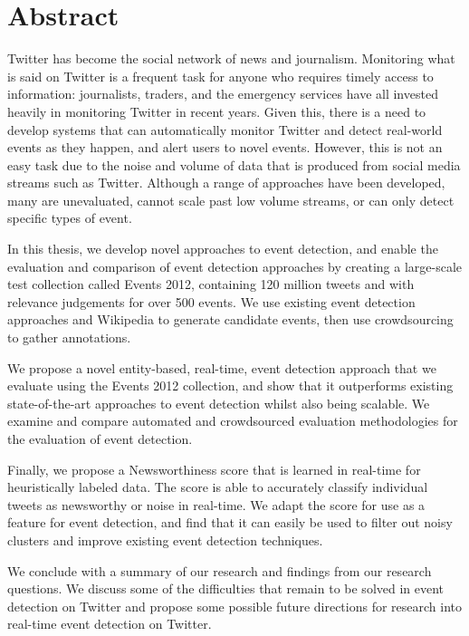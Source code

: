 
\chapter*{Abstract}
\thispagestyle{empty}
\vspace{-1cm}

Twitter has become the social network of news and journalism. Monitoring what is said on Twitter is a frequent task for anyone who requires timely access to information: journalists, traders, and the emergency services have all invested heavily in monitoring Twitter in recent years.
Given this, there is a need to develop systems that can automatically monitor Twitter and detect real-world events as they happen, and alert users to novel events. However, this is not an easy task due to the noise and volume of data that is produced from social media streams such as Twitter. Although a range of approaches have been developed, many are unevaluated, cannot scale past low volume streams, or can only detect specific types of event.

In this thesis, we develop novel approaches to event detection, and enable the evaluation and comparison of event detection approaches by creating a large-scale test collection called Events 2012, containing 120 million tweets and with relevance judgements for over 500 events. We use existing event detection approaches and Wikipedia to generate candidate events, then use crowdsourcing to gather annotations.

We propose a novel entity-based, real-time, event detection approach that we evaluate using the Events 2012 collection, and show that it outperforms existing state-of-the-art approaches to event detection whilst also being scalable.
We examine and compare automated and crowdsourced evaluation methodologies for the evaluation of event detection.

Finally, we propose a Newsworthiness score that is learned in real-time for heuristically labeled data. The score is able to accurately classify individual tweets as newsworthy or noise in real-time. We adapt the score for use as a feature for event detection, and find that it can easily be used to filter out noisy clusters and improve existing event detection techniques.

We conclude with a summary of our research and findings from our research questions. We discuss some of the difficulties that remain to be solved in event detection on Twitter and propose some possible future directions for research into real-time event detection on Twitter.